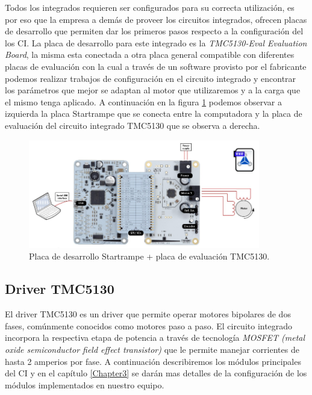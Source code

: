 Todos los integrados requieren ser configurados para su correcta utilización, es por eso que la empresa a demás de proveer los circuitos integrados, ofrecen placas de desarrollo que permiten dar los primeros pasos respecto a la configuración del los CI. La placa de desarrollo para este integrado es la \textit{TMC5130-Eval Evaluation Board}, la misma esta conectada a otra placa general compatible con diferentes placas de evaluación con la cual a través de un software provisto por el fabricante podemos realizar trabajos de configuración en el circuito integrado y encontrar los parámetros que mejor se adaptan al motor que utilizaremos y a la carga que el mismo tenga aplicado. A continuación en la figura \ref{fig:tmc5130_placa} podemos observar a izquierda la placa Startrampe  que se conecta entre la computadora y la placa de evaluación del circuito integrado TMC5130 que se observa a derecha.

\begin{figure}[ht]
\centering 
\includegraphics[width=0.9\textwidth]{./Figures/tmc5130_placa.png}
\caption{Placa de desarrollo Startrampe + placa de evaluación TMC5130.}
\label{fig:tmc5130_placa}
\end{figure}

  
\subsection{Driver TMC5130}

El driver TMC5130 es un driver que permite operar motores bipolares de dos fases, comúnmente conocidos como motores paso a paso. El circuito integrado incorpora la respectiva etapa de potencia a través de tecnología \textit{MOSFET (metal oxide semiconductor field effect transistor)}  que le permite manejar corrientes de hasta 2 amperios por fase.
A continuación describiremos los módulos principales del CI y en el capítulo \ref{Chapter3} se darán mas detalles de la configuración de los módulos implementados en nuestro equipo.

